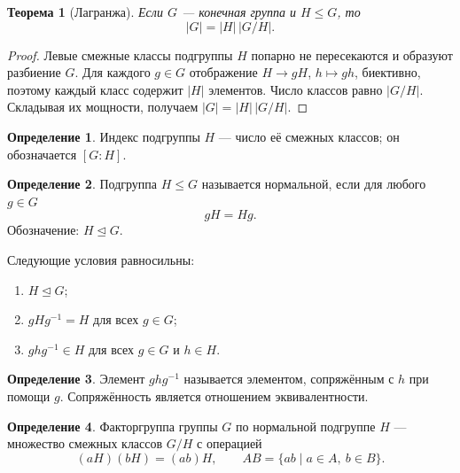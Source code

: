 \documentclass[12pt,a4paper,oneside,openany]{book}
\theoremstyle{definition}
\newtheorem{definition}{Определение}[chapter]
\theoremstyle{plain}
\newtheorem{theorem}{Теорема}[chapter]
\theoremstyle{remark}
\begin{document}
\begin{center}
\end{center}

\begin{theorem}[Лагранжа]
Если $G$ --- конечная группа и $H\leq G$, то
\[
  |G|=|H|\,|G/H|.
\]
\end{theorem}

\begin{proof}
Левые смежные классы подгруппы $H$ попарно не пересекаются и образуют
разбиение $G$. Для каждого $g\in G$ отображение
$H\to gH$, $h\mapsto gh$, биективно, поэтому каждый класс содержит
$|H|$ элементов. Число классов равно $|G/H|$. Складывая их мощности,
получаем $|G|=|H|\,|G/H|$.
\end{proof}

\begin{definition}
Индекс подгруппы $H$ --- число её смежных классов; он обозначается
$[G:H]$.
\end{definition}

\begin{definition}
Подгруппа $H\leq G$ называется нормальной, если для любого $g\in G$
\[
  gH=Hg.
\]
Обозначение: $H\trianglelefteq G$.
\end{definition}

Следующие условия равносильны:
\begin{enumerate}[label=\arabic*)]
  \item $H\trianglelefteq G$;
  \item $gHg^{-1}=H$ для всех $g\in G$;
  \item $ghg^{-1}\in H$ для всех $g\in G$ и $h\in H$.
\end{enumerate}

\begin{definition}
Элемент $ghg^{-1}$ называется элементом, сопряжённым с $h$ при помощи
$g$. Сопряжённость является отношением эквивалентности.
\end{definition}

\begin{definition}
Факторгруппа группы $G$ по нормальной подгруппе $H$ --- множество
смежных классов $G/H$ с операцией
\[
  (aH)(bH)=(ab)H,
  \qquad
  AB=\{ab\mid a\in A,\ b\in B\}.
\]
\end{definition}
\end{document}
